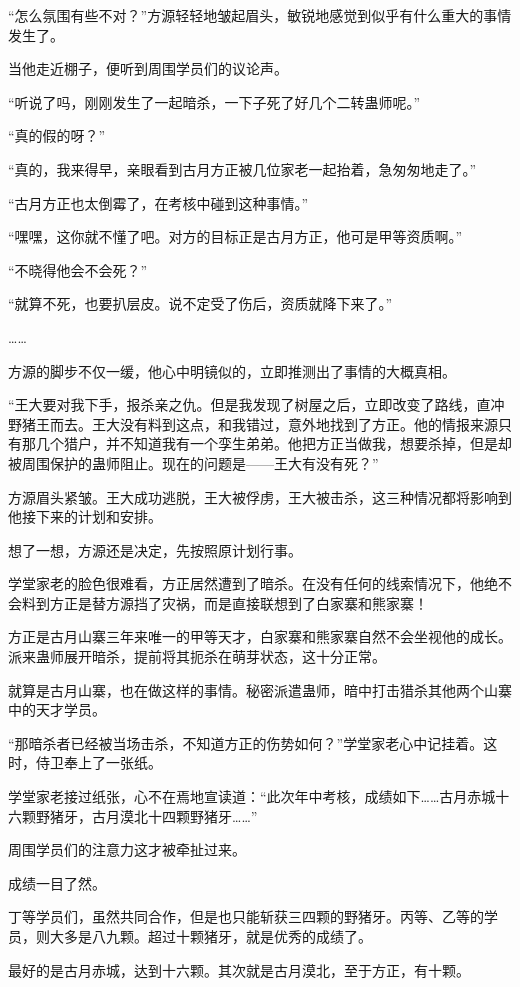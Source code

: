 \begin{this_body}
“怎么氛围有些不对？”方源轻轻地皱起眉头，敏锐地感觉到似乎有什么重大的事情发生了。

当他走近棚子，便听到周围学员们的议论声。

“听说了吗，刚刚发生了一起暗杀，一下子死了好几个二转蛊师呢。”

“真的假的呀？”

“真的，我来得早，亲眼看到古月方正被几位家老一起抬着，急匆匆地走了。”

“古月方正也太倒霉了，在考核中碰到这种事情。”

“嘿嘿，这你就不懂了吧。对方的目标正是古月方正，他可是甲等资质啊。”

“不晓得他会不会死？”

“就算不死，也要扒层皮。说不定受了伤后，资质就降下来了。”

……

方源的脚步不仅一缓，他心中明镜似的，立即推测出了事情的大概真相。

“王大要对我下手，报杀亲之仇。但是我发现了树屋之后，立即改变了路线，直冲野猪王而去。王大没有料到这点，和我错过，意外地找到了方正。他的情报来源只有那几个猎户，并不知道我有一个孪生弟弟。他把方正当做我，想要杀掉，但是却被周围保护的蛊师阻止。现在的问题是——王大有没有死？”

方源眉头紧皱。王大成功逃脱，王大被俘虏，王大被击杀，这三种情况都将影响到他接下来的计划和安排。

想了一想，方源还是决定，先按照原计划行事。

学堂家老的脸色很难看，方正居然遭到了暗杀。在没有任何的线索情况下，他绝不会料到方正是替方源挡了灾祸，而是直接联想到了白家寨和熊家寨！

方正是古月山寨三年来唯一的甲等天才，白家寨和熊家寨自然不会坐视他的成长。派来蛊师展开暗杀，提前将其扼杀在萌芽状态，这十分正常。

就算是古月山寨，也在做这样的事情。秘密派遣蛊师，暗中打击猎杀其他两个山寨中的天才学员。

“那暗杀者已经被当场击杀，不知道方正的伤势如何？”学堂家老心中记挂着。这时，侍卫奉上了一张纸。

学堂家老接过纸张，心不在焉地宣读道：“此次年中考核，成绩如下……古月赤城十六颗野猪牙，古月漠北十四颗野猪牙……”

周围学员们的注意力这才被牵扯过来。

成绩一目了然。

丁等学员们，虽然共同合作，但是也只能斩获三四颗的野猪牙。丙等、乙等的学员，则大多是八九颗。超过十颗猪牙，就是优秀的成绩了。

最好的是古月赤城，达到十六颗。其次就是古月漠北，至于方正，有十颗。


\end{this_body}
